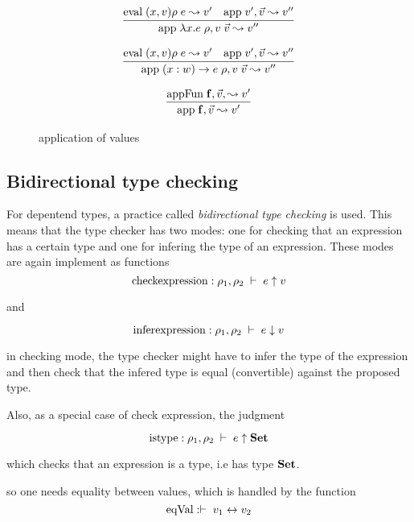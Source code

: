 \begin{figure}

\[
\begin{array}{c}
          
	  \infer{\App{\VLam{x}{e}{\rho}}{v \; \vec{v}}{v''}}
          {\Eval{(x,v)\rho}{e}{v'} & \App{v'}{\vec{v}}{v''}}
\end{array}
\]

\[
\begin{array}{c}
          
	  \infer{\App{\VPi{x}{w}{e}{\rho}}{v \; \vec{v}}{v''}}
          {\Eval{(x,v)\rho}{e}{v'} & \App{v'}{\vec{v}}{v''}}

\end{array}
\]

\[
\begin{array}{c}
          
	  \infer{\App{\ff}{\vec{v}}{v'}}
          {\AppFun{\ff}{\vec{v}}{v'}}
\end{array}
\]

\caption{application of values}
\end{figure}

\subsection{Bidirectional type checking} 
For depentend types, a practice called \emph{bidirectional type checking} is used.
This means that the type checker has two modes:
one for checking that an expression has a certain type and one for infering the type of an expression.
These modes are again implement as functions
\[ \mathrm{check expression} :  \Check{\rho_1}{\rho_2}{e}{v}\]

and

\[ \mathrm{infer expression} : \Infer{\rho_1}{\rho_2}{e}{v}\]

in checking mode, the type checker might have to infer the type of the expression and then check that the infered
type is equal (convertible) against the proposed type.

Also, as a special case of check expression, the judgment 

\[ \mathrm{is type} : \IsType{\rho_1}{\rho_2}{e}\]

which checks that an expression is a type, i.e has type $\Set$.

so one needs equality between values, which is handled by the function
\[ \mathrm{eqVal} : \EqVal{v_1}{v_2} \]


